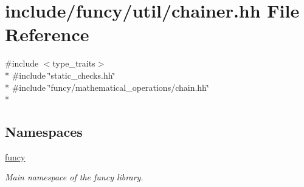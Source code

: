 \hypertarget{chainer_8hh}{\section{include/funcy/util/chainer.hh File Reference}
\label{chainer_8hh}
}
{\ttfamily \#include $<$type\-\_\-traits$>$}\\*
{\ttfamily \#include \char`\"{}static\-\_\-checks.\-hh\char`\"{}}\\*
{\ttfamily \#include \char`\"{}funcy/mathematical\-\_\-operations/chain.\-hh\char`\"{}}\\*
\subsection*{Namespaces}
\begin{DoxyCompactItemize}
\item 
\hyperlink{namespacefuncy}{funcy}
\begin{DoxyCompactList}\small\item\em Main namespace of the funcy library. \end{DoxyCompactList}\end{DoxyCompactItemize}
